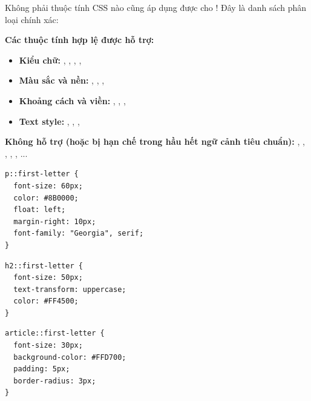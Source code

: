 \begin{warnBox}
Không phải thuộc tính CSS nào cũng áp dụng được cho ! Đây là danh sách phân loại chính xác:
\par\vspace{4pt}
\textbf{Các thuộc tính hợp lệ được hỗ trợ:}
\begin{itemize}[leftmargin=1.5em, itemsep=2pt, parsep=0pt]
    \item \textbf{Kiểu chữ:} , , , , 
    \item \textbf{Màu sắc và nền:} , , , 
    \item \textbf{Khoảng cách và viền:} , , , 
    \item \textbf{Text style:} , , , 
\end{itemize}
\par\vspace{4pt}
\textbf{Không hỗ trợ (hoặc bị hạn chế trong hầu hết ngữ cảnh tiêu chuẩn):} , , , , , ...
\end{warnBox}

\begin{codeWindow}
\begin{lstlisting}[language=CSS3]
p::first-letter {
  font-size: 60px;
  color: #8B0000;
  float: left;
  margin-right: 10px;
  font-family: "Georgia", serif;
}
\end{lstlisting}
\end{codeWindow}

\begin{codeWindow}
\begin{lstlisting}[language=CSS3]
h2::first-letter {
  font-size: 50px;
  text-transform: uppercase;
  color: #FF4500;
}
\end{lstlisting}
\end{codeWindow}

\begin{codeWindow}
\begin{lstlisting}[language=CSS3]
article::first-letter {
  font-size: 30px;
  background-color: #FFD700;
  padding: 5px;
  border-radius: 3px;
}
\end{lstlisting}
\end{codeWindow}

